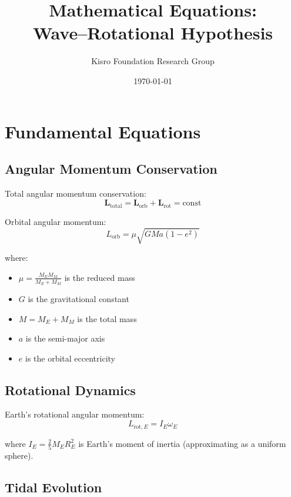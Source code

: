 \documentclass[12pt,a4paper]{article}
\title{Mathematical Equations: \\
Wave–Rotational Hypothesis}
\author{Kisro Foundation Research Group}
\date{\today}
\begin{document}
\maketitle

\section{Fundamental Equations}

\subsection{Angular Momentum Conservation}

Total angular momentum conservation:
\begin{equation}
\mathbf{L}_{\text{total}} = \mathbf{L}_{\text{orb}} + \mathbf{L}_{\text{rot}} = \text{const}
\label{eq:angular_momentum}
\end{equation}

Orbital angular momentum:
\begin{equation}
L_{\text{orb}} = \mu \sqrt{GMa(1-e^2)}
\label{eq:orbital_L}
\end{equation}

where:
\begin{itemize}
    \item $\mu = \frac{M_E M_M}{M_E + M_M}$ is the reduced mass
    \item $G$ is the gravitational constant
    \item $M = M_E + M_M$ is the total mass
    \item $a$ is the semi-major axis
    \item $e$ is the orbital eccentricity
\end{itemize}

\subsection{Rotational Dynamics}

Earth's rotational angular momentum:
\begin{equation}
L_{\text{rot},E} = I_E \omega_E
\label{eq:earth_rotation}
\end{equation}

where $I_E = \frac{2}{5}M_E R_E^2$ is Earth's moment of inertia (approximating as a uniform sphere).

\subsection{Tidal Evolution}
\end{document}
